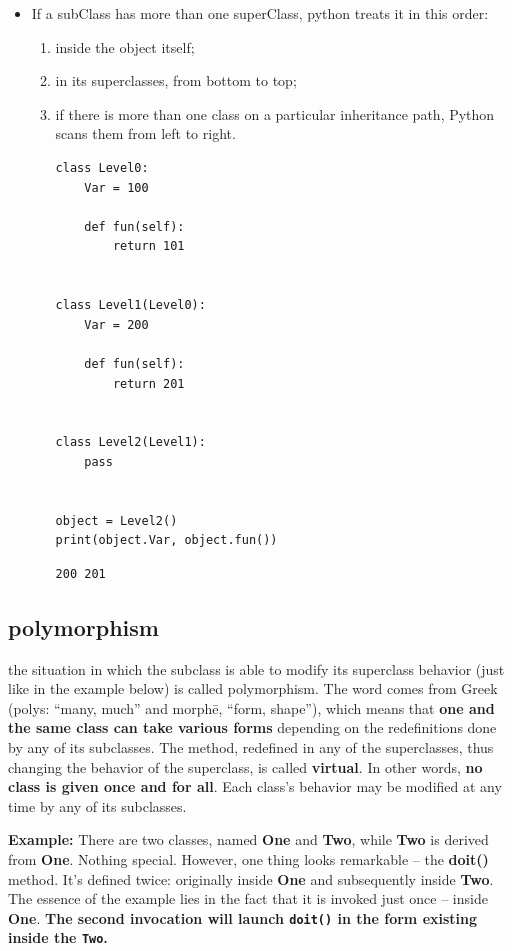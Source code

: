 \documentclass[11pt]{article}
\begin{document}
\begin{itemize}
\item If a subClass has more than one superClass, python treats it in this
order:

\begin{enumerate}
\item inside the object itself;
\item in its superclasses, from bottom to top;
\item if there is more than one class on a particular inheritance path,
Python scans them from left to right.

\begin{verbatim}
class Level0:
	Var = 100

	def fun(self):
		return 101


class Level1(Level0):
	Var = 200

	def fun(self):
		return 201


class Level2(Level1):
	pass


object = Level2()
print(object.Var, object.fun())

\end{verbatim}

\begin{verbatim}
200 201
\end{verbatim}
\end{enumerate}
\end{itemize}
\subsection{polymorphism}
\label{sec:org42a1f4d}

the situation in which the subclass is able to modify its superclass
behavior (just like in the example below) is called polymorphism. The
word comes from Greek (polys: “many, much” and morphē, “form, shape”),
which means that \textbf{one and the same class can take various forms}
depending on the redefinitions done by any of its subclasses. The
method, redefined in any of the superclasses, thus changing the
behavior of the superclass, is called \textbf{virtual}. In other words, \textbf{no}
\textbf{class is given once and for all}. Each class’s behavior may be modified
at any time by any of its subclasses.


 \textbf{Example:} There are two classes, named \textbf{One} and \textbf{Two}, while \textbf{Two}
is derived from \textbf{One}. Nothing special. However, one thing looks
remarkable – the \textbf{doit()} method. It’s defined twice: originally
inside \textbf{One} and subsequently inside \textbf{Two}. The essence of the example
lies in the fact that it is invoked just once – inside \textbf{One}.
\textbf{The second invocation will launch \texttt{doit()} in the form existing inside the \texttt{Two}.}
\end{document}
